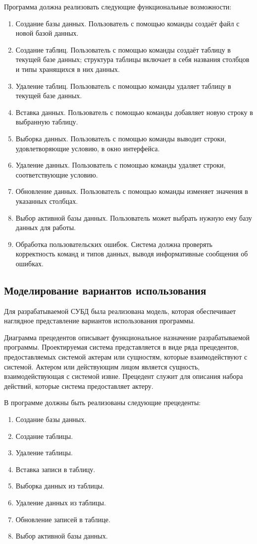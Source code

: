 Программа должна реализовать следующие функциональные возможности:
\begin{enumerate}
	\item Создание базы данных. Пользователь с помощью команды создаёт файл с новой базой данных.
	\item Создание таблиц. Пользователь с помощью команды создаёт таблицу в текущей базе данных; структура таблицы включает в себя названия столбцов и типы хранящихся в них данных.
	\item Удаление таблиц. Пользователь с помощью команды удаляет таблицу в текущей базе данных.
	\item Вставка данных. Пользователь с помощью команды добавляет новую строку в выбранную таблицу.
	\item Выборка данных. Пользователь с помощью команды выводит строки, удовлетворяющие условию, в окно интерфейса.
	\item Удаление данных. Пользователь с помощью команды удаляет строки, соответствующие условию.
	\item Обновление данных. Пользователь с помощью команды изменяет значения в указанных столбцах.
	\item Выбор активной базы данных. Пользователь может выбрать нужную ему базу данных для работы.
	\item Обработка пользовательских ошибок. Система должна проверять корректность команд и типов данных, выводя информативные сообщения об ошибках.
\end{enumerate}

\subsection{Моделирование вариантов использования}

Для разрабатываемой СУБД была реализована модель, которая обеспечивает наглядное представление вариантов использования программы.

Диаграмма прецедентов описывает функциональное назначение разрабатываемой программы. Проектируемая система представляется в виде ряда прецедентов, предоставляемых системой актерам или сущностям, которые взаимодействуют с системой. Актером или действующим лицом является сущность, взаимодействующая с системой извне. Прецедент служит для описания набора действий, которые система предоставляет актеру.

В программе должны быть реализованы следующие прецеденты:
\begin{enumerate}
	\item Создание базы данных.
	\item Создание таблицы.
	\item Удаление таблицы.
	\item Вставка записи в таблицу.
	\item Выборка данных из таблицы.
	\item Удаление данных из таблицы.
	\item Обновление записей в таблице.
	\item Выбор активной базы данных.	
\end{enumerate}

